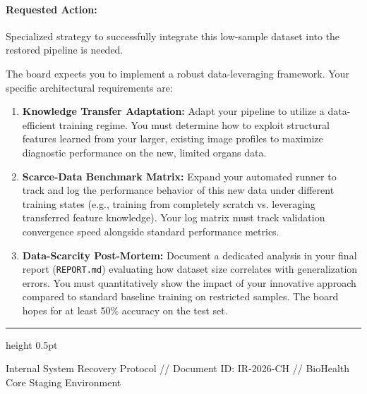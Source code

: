 \documentclass[11pt,a4paper]{article}
\begin{document}
\paragraph{Requested Action:}
Specialized strategy to successfully integrate this low-sample dataset into the restored pipeline is needed.

The board expects you to implement a robust data-leveraging framework. Your specific architectural requirements are:

\begin{enumerate}
    \item \textbf{Knowledge Transfer Adaptation:} Adapt your pipeline to utilize a data-efficient training regime. You must determine how to exploit structural features learned from your larger, existing image profiles to maximize diagnostic performance on the new, limited organs data.
    \item \textbf{Scarce-Data Benchmark Matrix:} Expand your automated runner to track and log the performance behavior of this new data under different training states (e.g., training from completely scratch vs. leveraging transferred feature knowledge). Your log matrix must track validation convergence speed alongside standard performance metrics.
    \item \textbf{Data-Scarcity Post-Mortem:} Document a dedicated analysis in your final report (\texttt{REPORT.md}) evaluating how dataset size correlates with generalization errors. You must quantitatively show the impact of your innovative approach compared to standard baseline training on restricted samples. The board hopes for at least 50\% accuracy on the test set. 
\end{enumerate}


\vspace{0.8cm}
\hrule height 0.5pt
\vspace{0.2cm}
\begin{center}
    \small \color{gray} Internal System Recovery Protocol // Document ID: IR-2026-CH // BioHealth Core Staging Environment
\end{center}
\end{document}
